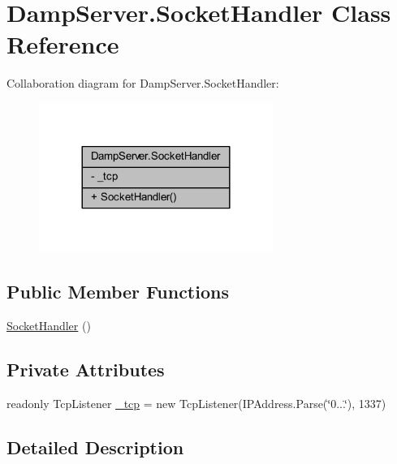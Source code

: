 \hypertarget{class_damp_server_1_1_socket_handler}{\section{Damp\-Server.\-Socket\-Handler Class Reference}
\label{class_damp_server_1_1_socket_handler}
}


Collaboration diagram for Damp\-Server.\-Socket\-Handler\-:
\nopagebreak
\begin{figure}[H]
\begin{center}
\leavevmode
\includegraphics[width=216pt]{class_damp_server_1_1_socket_handler__coll__graph}
\end{center}
\end{figure}
\subsection*{Public Member Functions}
\begin{DoxyCompactItemize}
\item 
\hyperlink{class_damp_server_1_1_socket_handler_af93452a4c0d6406d46e5df6a36186978}{Socket\-Handler} ()
\end{DoxyCompactItemize}
\subsection*{Private Attributes}
\begin{DoxyCompactItemize}
\item 
readonly Tcp\-Listener \hyperlink{class_damp_server_1_1_socket_handler_ac3f676dd4089872d80c88d31784661d5}{\-\_\-tcp} = new Tcp\-Listener(I\-P\-Address.\-Parse(\char`\"{}0...\char`\"{}), 1337)
\end{DoxyCompactItemize}


\subsection{Detailed Description}


